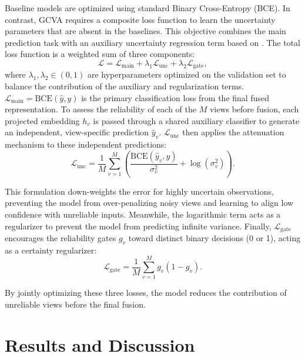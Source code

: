 \documentclass[journal]{IEEEtran}
\begin{document}
Baseline models are optimized using standard Binary Cross-Entropy (BCE). In contrast, GCVA requires a composite loss function to learn the uncertainty parameters that are absent in the baselines. This objective combines the main prediction task with an auxiliary uncertainty regression term based on \cite{kendall2017uncertainties}. The total loss function is a weighted sum of three components:
\begin{equation} \label{eq:total_loss}
    \mathcal{L} = \mathcal{L}_{\text{main}} + \lambda_1\mathcal{L}_{\text{unc}} + \lambda_2\mathcal{L}_{\text{gate}},
\end{equation}
where $\lambda_1, \lambda_2 \in (0,1)$ are hyperparameters optimized on the validation set to balance the contribution of the auxiliary and regularization terms. $\mathcal{L}_{\text{main}} = \text{BCE}(\hat{y}, y)$ is the primary classification loss from the final fused representation. 
To assess the reliability of each of the $M$ views before fusion, each projected embedding $h_v$ is passed through a shared auxiliary classifier to generate an independent, view-specific prediction $\hat{y}_v$. $\mathcal{L}_{\text{unc}}$ then applies the attenuation mechanism to these independent predictions:
\begin{equation} \label{eq:unc_loss}
    \mathcal{L}_{\text{unc}} = \frac{1}{M} \sum_{v=1}^{M} \left( \frac{\text{BCE}(\hat{y}_v, y)}{\sigma_v^2} + \log(\sigma_v^2) \right).
\end{equation}


This formulation down-weights the error for highly uncertain observations, preventing the model from over-penalizing noisy views and learning to align low confidence with unreliable inputs. Meanwhile, the logarithmic term acts as a regularizer to prevent the model from predicting infinite variance. Finally, $\mathcal{L}_{\text{gate}}$ encourages the reliability gates $g_v$ toward distinct binary decisions (0 or 1), acting as a certainty regularizer:
\begin{equation} \label{eq:gate_loss}
    \mathcal{L}_{\text{gate}} = \frac{1}{M} \sum_{v=1}^{M} g_v(1 - g_v).
\end{equation}

By jointly optimizing these three losses, the model reduces the contribution of unreliable views before the final fusion.

\section{Results and Discussion} \label{sec:results_discuss}
\end{document}
